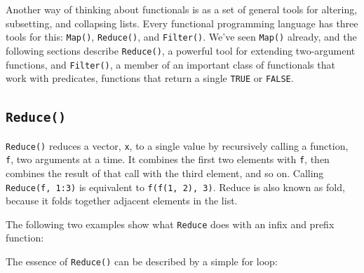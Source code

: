 Another way of thinking about functionals is as a set of general tools
for altering, subsetting, and collapsing lists. Every functional
programming language has three tools for this: \texttt{Map()},
\texttt{Reduce()}, and \texttt{Filter()}. We've seen \texttt{Map()}
already, and the following sections describe \texttt{Reduce()}, a
powerful tool for extending two-argument functions, and
\texttt{Filter()}, a member of an important class of functionals that
work with predicates, functions that return a single \texttt{TRUE} or
\texttt{FALSE}.

\hypertarget{reduce}{%
\subsection{\texorpdfstring{\texttt{Reduce()}}{Reduce()}}\label{reduce}}

\texttt{Reduce()} reduces a vector, \texttt{x}, to a single value by
recursively calling a function, \texttt{f}, two arguments at a time. It
combines the first two elements with \texttt{f}, then combines the
result of that call with the third element, and so on. Calling
\texttt{Reduce(f,\ 1:3)} is equivalent to \texttt{f(f(1,\ 2),\ 3)}.
Reduce is also known as fold, because it folds together adjacent
elements in the list.  

The following two examples show what \texttt{Reduce} does with an infix
and prefix function:

\begin{Shaded}
\begin{Highlighting}[]
\NormalTok{(}\DataTypeTok{+}\NormalTok{, }\OperatorTok{:}\NormalTok{) }
\OperatorTok{:}\NormalTok{) }
\end{Highlighting}
\end{Shaded}

The essence of \texttt{Reduce()} can be described by a simple for loop:

\begin{Shaded}
\begin{Highlighting}[]
\StringTok{ }
\StringTok{ }\NormalTok{x[[}\NormalTok{]]}
   \NormalTok{(}\NormalTok{, }
\StringTok{ }
\NormalTok{  \}}
\NormalTok{\}}
\end{Highlighting}
\end{Shaded}

